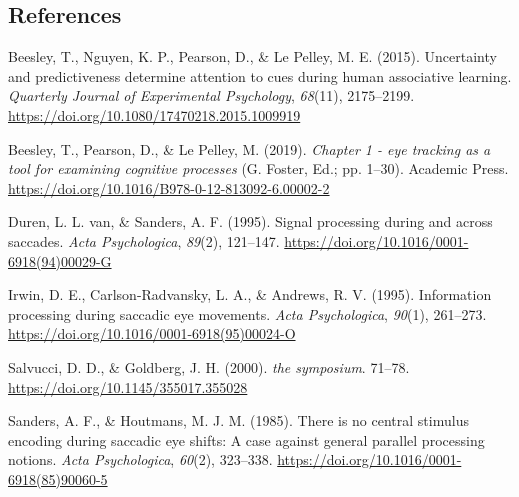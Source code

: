\documentclass[
  man,
  floatsintext,
  longtable,
  nolmodern,
  notxfonts,
  notimes,
  colorlinks=true,linkcolor=blue,citecolor=blue,urlcolor=blue]{apa7}
\newlength{\cslhangindent}
\newenvironment{CSLReferences}[2] %
 {\begin{list}{}{%
  \setlength{\itemindent}{0pt}
  \setlength{\leftmargin}{0pt}
  \setlength{\parsep}{0pt}
  \ifodd #1
   \setlength{\leftmargin}{\cslhangindent}
   \setlength{\itemindent}{-1\cslhangindent}
  \fi
  \setlength{\itemsep}{#2\baselineskip}}}
 {\end{list}}
\begin{document}
\subsection{References}\label{references}

\label{refs}
\begin{CSLReferences}{1}{0}
Beesley, T., Nguyen, K. P., Pearson, D., \& Le Pelley, M. E. (2015).
Uncertainty and predictiveness determine attention to cues during human
associative learning. \emph{Quarterly Journal of Experimental
Psychology}, \emph{68}(11), 2175--2199.
\url{https://doi.org/10.1080/17470218.2015.1009919}

Beesley, T., Pearson, D., \& Le Pelley, M. (2019). \emph{Chapter 1 - eye
tracking as a tool for examining cognitive processes} (G. Foster, Ed.;
pp. 1--30). Academic Press.
\url{https://doi.org/10.1016/B978-0-12-813092-6.00002-2}

Duren, L. L. van, \& Sanders, A. F. (1995). Signal processing during and
across saccades. \emph{Acta Psychologica}, \emph{89}(2), 121--147.
\url{https://doi.org/10.1016/0001-6918(94)00029-G}

Irwin, D. E., Carlson-Radvansky, L. A., \& Andrews, R. V. (1995).
Information processing during saccadic eye movements. \emph{Acta
Psychologica}, \emph{90}(1), 261--273.
\url{https://doi.org/10.1016/0001-6918(95)00024-O}

Salvucci, D. D., \& Goldberg, J. H. (2000). \emph{the symposium}.
71--78. \url{https://doi.org/10.1145/355017.355028}

Sanders, A. F., \& Houtmans, M. J. M. (1985). There is no central
stimulus encoding during saccadic eye shifts: A case against general
parallel processing notions. \emph{Acta Psychologica}, \emph{60}(2),
323--338. \url{https://doi.org/10.1016/0001-6918(85)90060-5}

\end{CSLReferences}
\end{document}
